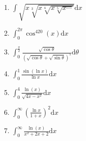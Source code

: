 \documentclass[11pt, a4paper]{article}
\newcommand{\dd}{\mathrm{d}}
\begin{document}



\begin{enumerate}
    \item $\int \sqrt{x\sqrt[3]{x\sqrt[4]{x\sqrt[5]{x\cdots}}}} \dd x$ 
    \item $\int_0^{2\pi} \cos^{420}(x) \dd x$ 
    \item $\int_0^{\frac{\pi}{2}} \frac{\sqrt{\cos{\theta}}}{(\sqrt{\cos{\theta}}+\sqrt{\sin{\theta}})^5} \dd \theta$  
    \item $\int_0^1 \frac{\sin(\ln{x})}{\ln{x}} \dd x$ 
    \item $\int_0^4 \frac{\ln(x)}{\sqrt{4x-x^2}} \dd x$ 
    \item $\int_0^{\infty} \left(\frac{\ln{x}}{1+x}\right)^2 \dd x$ 
    \item $\int_0^{\infty} \frac{\ln(x)}{x^2+2x+2} \dd x$ 

\end{enumerate}
\end{document}

